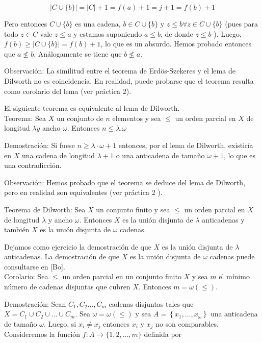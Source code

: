 \documentclass[10pt]{article}
\begin{document}
$$
|C \cup\{b\}|=|C|+1=f(a)+1=j+1=f(b)+1
$$

Pero entonces $C \cup\{b\}$ es una cadena, $b \in C \cup\{b\}$ y $z \leq b \forall z \in C \cup\{b\}$ (pues para todo $z \in C$ vale $z \leq a$ y estamos suponiendo $a \leq b$, de donde $z \leq b$ ). Luego, $f(b) \geq|C \cup\{b\}|=f(b)+1$, lo que es un absurdo. Hemos probado entonces que $a \not \leq b$. Análogamente se tiene que $b \not \leq a$.

Observación: La similitud entre el teorema de Erdös-Szekeres y el lema de Dilworth no es coincidencia. En realidad, puede probarse que el teorema resulta como corolario del lema (ver práctica 2).

El siguiente teorema es equivalente al lema de Dilworth.\\
Teorema: Sea $X$ un conjunto de $n$ elementos y sea $\leq$ un orden parcial en $X$ de longitud $\lambda y$ ancho $\omega$. Entonces $n \leq \lambda . \omega$

Demostración: Si fuese $n \geq \lambda \cdot \omega+1$ entonces, por el lema de Dilworth, existiría en $X$ una cadena de longitud $\lambda+1$ o una anticadena de tamaño $\omega+1$, lo que es una contradicción.

Observación: Hemos probado que el teorema se deduce del lema de Dilworth, pero en realidad son equivalentes (ver práctica 2 ).

Teorema de Dilworth: Sea $X$ un conjunto finito y sea $\leq$ un orden parcial en $X$ de longitud $\lambda$ y ancho $\omega$. Entonces $X$ es la unión disjunta de $\lambda$ anticadenas y también $X$ es la unión disjunta de $\omega$ cadenas.

Dejamos como ejercicio la demostración de que $X$ es la unión disjunta de $\lambda$ anticadenas. La demostración de que $X$ es la unión disjunta de $\omega$ cadenas puede consultarse en [Bo].\\
Corolario: Sea $\leq$ un orden parcial en un conjunto finito $X$ y sea $m$ el mínimo número de cadenas disjuntas que cubren $X$. Entonces $m=\omega(\leq)$.

Demostración: Sean $C_{1}, C_{2} \ldots, C_{m}$ cadenas disjuntas tales que $X=C_{1} \cup C_{2} \cup \ldots \cup C_{m}$. Sea $\omega=\omega(\leq)$ y sea $A=\left\{x_{1}, \ldots, x_{\omega}\right\}$ una anticadena de tamaño $\omega$. Luego, si $x_{i} \neq x_{j}$ entonces $x_{i}$ y $x_{j}$ no son comparables.\\
Consideremos la función $f: A \longrightarrow\{1,2, \ldots, m\}$ definida por
\end{document}
